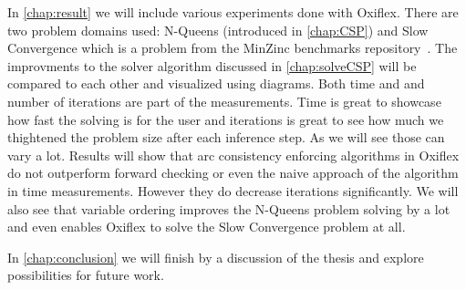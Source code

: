 In \cref{chap:result} we will include various experiments done with Oxiflex. There are two problem domains used: N-Queens (introduced in \cref{chap:CSP}) and Slow Convergence which is a problem from the MinZinc benchmarks repository~\cite{minizinc_slow:2018}. The improvments to the solver algorithm discussed in \cref{chap:solveCSP} will be compared to each other and visualized using diagrams. Both time and and number of iterations are part of the measurements. Time is great to showcase how fast the solving is for the user and iterations is great to see how much we thightened the problem size after each inference step. As we will see those can vary a lot. Results will show that arc consistency enforcing algorithms in Oxiflex do not outperform forward checking or even the naive approach of the algorithm in time measurements. However they do decrease iterations significantly. We will also see that variable ordering improves the N-Queens problem solving by a lot and even enables Oxiflex to solve the Slow Convergence problem at all.

In \cref{chap:conclusion} we will finish by a discussion of the thesis and explore possibilities for future work.

